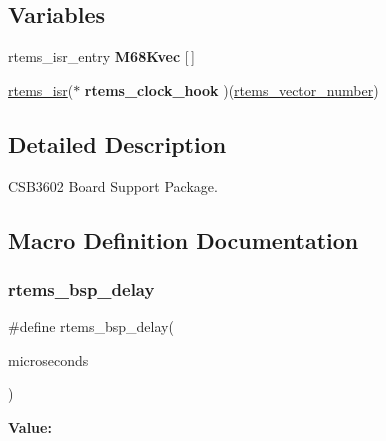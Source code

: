 \subsection*{Variables}
\begin{DoxyCompactItemize}
\item 
\mbox{\label{group__RTEMSBSPsM68kCSB3602_ga744e8a50e2dcbb8fb7e6b0c7554008f9}} 
rtems\+\_\+isr\+\_\+entry {\bfseries M68\+Kvec} \mbox{[}$\,$\mbox{]}
\item 
\mbox{\label{group__RTEMSBSPsM68kCSB3602_ga6d054cf6ceb4bb5727c333f20cd3a257}} 
\mbox{\hyperlink{group__ClassicINTR_ga17fb491bd308ce6b1bf27a51dec0b46d}{rtems\+\_\+isr}}($\ast$ {\bfseries rtems\+\_\+clock\+\_\+hook} )(\mbox{\hyperlink{group__ClassicINTR_ga3e434c197d99f128e78cae4d9358bd8b}{rtems\+\_\+vector\+\_\+number}})
\end{DoxyCompactItemize}


\subsection{Detailed Description}
C\+S\+B3602 Board Support Package. 



\subsection{Macro Definition Documentation}
\mbox{\label{group__RTEMSBSPsM68kCSB3602_gaa227a93db3561a86689137fbd6e10101}} 
\subsubsection{\texorpdfstring{rtems\_bsp\_delay}{rtems\_bsp\_delay}}
{\footnotesize\ttfamily \#define rtems\+\_\+bsp\+\_\+delay(\begin{DoxyParamCaption}\item[{}]{microseconds }\end{DoxyParamCaption})}

{\bfseries Value\+:}
\begin{DoxyCode}{0}
\DoxyCodeLine{  \}}

\end{DoxyCode}


